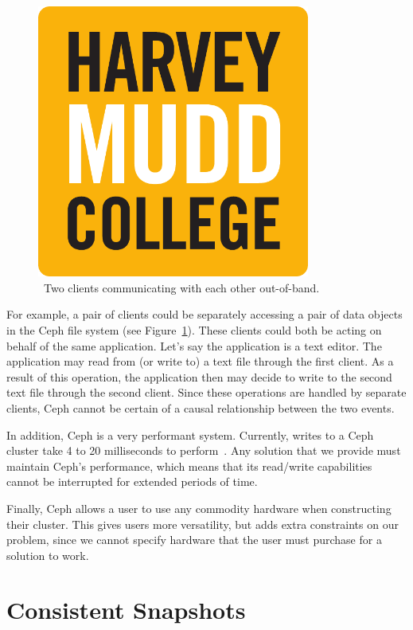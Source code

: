 \begin{figure}[h]
  \centering
  \caption{~Two clients communicating with each other out-of-band.} 
  \label{fig:out-of-band}
  \includegraphics[width=0.8\textwidth]{hmclogo.pdf}%
\end{figure}

For example, a pair of clients could be separately accessing a pair of data 
objects in the Ceph file system (see Figure~\ref{fig:out-of-band}). These clients could both be acting on behalf 
of the same application. Let's say the application is a text editor. The 
application may read from (or write to) a text file through the first client. 
As a result of this operation, the application then may decide to write to the 
second text file through the second client. Since these operations are handled 
by separate clients, Ceph cannot be certain of a causal relationship between 
the two events. 

In addition, Ceph is a very performant system. Currently, writes to a Ceph 
cluster take 4 to 20 milliseconds to perform~\citep{Sage}. Any solution that 
we provide must maintain Ceph's performance, which means that its read/write 
capabilities cannot be interrupted for extended periods of time.

Finally, Ceph allows a user to use any commodity hardware when constructing 
their cluster. This gives users more versatility, but adds extra constraints 
on our problem, since we cannot specify hardware that the user must purchase 
for a solution to work.

\section{Consistent Snapshots}


